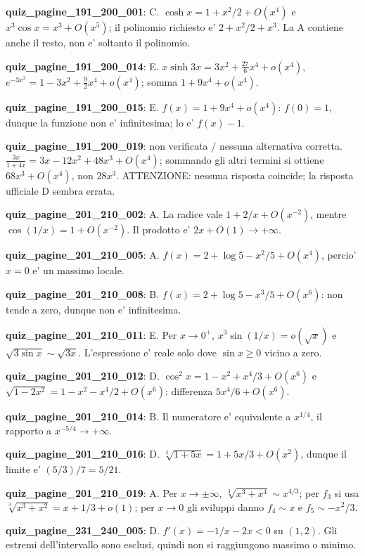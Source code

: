 \documentclass[11pt,a4paper]{article}
\newcounter{quiz}
\begin{document}
\noindent\textbf{quiz\_pagine\_191\_200\_001}: C. $\cosh x=1+x^2/2+O(x^4)$ e $x^3\cos x=x^3+O(x^5)$; il polinomio richiesto e' $2+x^2/2+x^3$. La A contiene anche il resto, non e' soltanto il polinomio.\par\medskip
\noindent\textbf{quiz\_pagine\_191\_200\_014}: E. $x\sinh3x=3x^2+\frac{27}6x^4+o(x^4)$, $e^{-3x^2}=1-3x^2+\frac92x^4+o(x^4)$; somma $1+9x^4+o(x^4)$.\par\medskip
\noindent\textbf{quiz\_pagine\_191\_200\_015}: E. $f(x)=1+9x^4+o(x^4)$: $f(0)=1$, dunque la funzione non e' infinitesima; lo e' $f(x)-1$.\par\medskip
\noindent\textbf{quiz\_pagine\_191\_200\_019}: non verificata / nessuna alternativa corretta. $\frac{3x}{1+4x}=3x-12x^2+48x^3+O(x^4)$; sommando gli altri termini si ottiene $68x^3+O(x^4)$, non $28x^3$. ATTENZIONE: nessuna risposta coincide; la risposta ufficiale D sembra errata.\par\medskip
\noindent\textbf{quiz\_pagine\_201\_210\_002}: A. La radice vale $1+2/x+O(x^{-2})$, mentre $\cos(1/x)=1+O(x^{-2})$. Il prodotto e' $2x+O(1)\to+\infty$.\par\medskip
\noindent\textbf{quiz\_pagine\_201\_210\_005}: A. $f(x)=2+\log5-x^2/5+O(x^4)$, percio' $x=0$ e' un massimo locale.\par\medskip
\noindent\textbf{quiz\_pagine\_201\_210\_008}: B. $f(x)=2+\log5-x^3/5+O(x^6)$: non tende a zero, dunque non e' infinitesima.\par\medskip
\noindent\textbf{quiz\_pagine\_201\_210\_011}: E. Per $x\to0^+$, $x^3\sin(1/x)=o(\sqrt x)$ e $\sqrt{3\sin x}\sim\sqrt{3x}$. L'espressione e' reale solo dove $\sin x\ge0$ vicino a zero.\par\medskip
\noindent\textbf{quiz\_pagine\_201\_210\_012}: D. $\cos^2x=1-x^2+x^4/3+O(x^6)$ e $\sqrt{1-2x^2}=1-x^2-x^4/2+O(x^6)$: differenza $5x^4/6+O(x^6)$.\par\medskip
\noindent\textbf{quiz\_pagine\_201\_210\_014}: B. Il numeratore e' equivalente a $x^{1/4}$, il rapporto a $x^{-5/4}\to+\infty$.\par\medskip
\noindent\textbf{quiz\_pagine\_201\_210\_016}: D. $\sqrt[3]{1+5x}=1+5x/3+O(x^2)$, dunque il limite e' $(5/3)/7=5/21$.\par\medskip
\noindent\textbf{quiz\_pagine\_201\_210\_019}: A. Per $x\to\pm\infty$, $\sqrt[3]{x^3+x^4}\sim x^{4/3}$; per $f_3$ si usa $\sqrt[3]{x^3+x^2}=x+1/3+o(1)$; per $x\to0$ gli sviluppi danno $f_4\sim x$ e $f_5\sim-x^2/3$.\par\medskip
\noindent\textbf{quiz\_pagine\_231\_240\_005}: D. $f\prime(x)=-1/x-2x<0$ su $(1,2)$. Gli estremi dell'intervallo sono esclusi, quindi non si raggiungono massimo o minimo.\par\medskip
\end{document}

